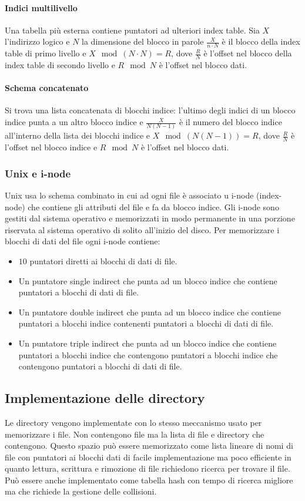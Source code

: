 \paragraph{Indici multilivello} Una tabella pi\`u esterna contiene puntatori ad ulteriori index table. Sia $X$ l'indirizzo logico e $N$ la dimensione del blocco in parole 
$\frac{X}{n\cdot N}$ \`e il blocco della index table di primo livello e $X\mod (N\cdot N) = R$, dove $\frac{R}{N}$ \`e l'offset nel blocco della index table di secondo livello e 
$R\mod N$ \`e l'offset nel blocco dati.
\paragraph{Schema concatenato} Si trova una lista concatenata di blocchi indice: l'ultimo degli indici di un blocco indice punta a un altro blocco indice e $\frac{X}{N(N-1)}$ \`e il 
numero del blocco indice all'interno della lista dei blocchi indice e $X\mod(N(N-1)) = R$, dove $\frac{R}{N}$ \`e l'offset nel blocco indice e $R\mod N$ \`e l'offset nel blocco dati. 
\subsubsection{Unix e i-node}
Unix usa lo schema combinato in cui ad ogni file \`e associato u i-node (index-node) che contiene gli attributi del file e fa da blocco indice. Gli i-node sono gestiti dal sistema 
operativo e memorizzati in modo permanente in una porzione riservata al sistema operativo di solito all'inizio del disco. Per memorizzare i blocchi di dati del file ogni i-node contiene:
\begin{itemize}
	\item $10$ puntatori diretti ai blocchi di dati di file.
	\item Un puntatore single indirect che punta ad un blocco indice che contiene puntatori a blocchi di dati di file.
	\item Un puntatore double indirect che punta ad un blocco indice che contiene puntatori a blocchi indice contenenti puntatori a blocchi di dati di file.
	\item Un puntatore triple indirect che punta ad un blocco indice che contiene puntatori a blocchi indice che contengono puntatori a blocchi indice che contengono puntatori a
		blocchi di dati di file. 
\end{itemize}
\subsection{Implementazione delle directory}
Le directory vengono implementate con lo stesso meccanismo usato per memorizzare i file. Non contengono file ma la lista di file e directory che contengono. Questo spazio pu\`o essere
memorizzato come lista lineare di nomi di file con puntatori ai blocchi dati di facile implementazione ma poco efficiente in quanto lettura, scrittura e rimozione di file richiedono 
ricerca per trovare il file. Pu\`o essere anche implementato come tabella hash con tempo di ricerca migliore ma che richiede la gestione delle collisioni. 
